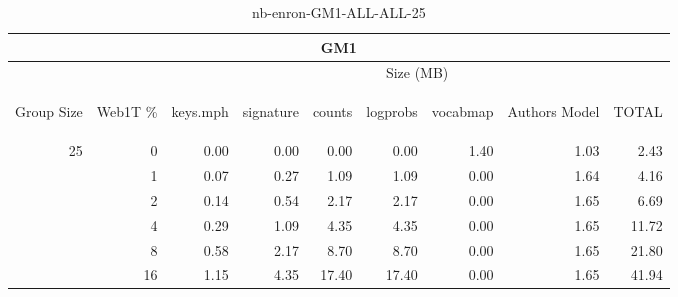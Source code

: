 \begin{center}
\begin{table}[htbp]
\begin{tabular}{ | r | r | r | r | r | r | r | r | r |}
\hline
\multicolumn{9}{|c|}{GM1}\\
\hline
 & & \multicolumn{7}{|c|}{Size (MB)}\\ \cline{3-9}
\begin{sideways}Group Size\end{sideways} & \begin{sideways}Web1T \% \end{sideways} & \begin{sideways}keys.mph\end{sideways} & \begin{sideways}signature\end{sideways} & \begin{sideways}counts\end{sideways} & \begin{sideways}logprobs\end{sideways} & \begin{sideways}vocabmap\end{sideways} & \begin{sideways}Authors Model \end{sideways} & \begin{sideways}TOTAL\end{sideways}\\
\hline
\multirow{5}{*}{25}
 & 0 & 0.00 & 0.00 & 0.00 & 0.00 & 1.40 & 1.03 & 2.43\\ \cline{2-9}
 & 1 & 0.07 & 0.27 & 1.09 & 1.09 & 0.00 & 1.64 & 4.16\\ \cline{2-9}
 & 2 & 0.14 & 0.54 & 2.17 & 2.17 & 0.00 & 1.65 & 6.69\\ \cline{2-9}
 & 4 & 0.29 & 1.09 & 4.35 & 4.35 & 0.00 & 1.65 & 11.72\\ \cline{2-9}
 & 8 & 0.58 & 2.17 & 8.70 & 8.70 & 0.00 & 1.65 & 21.80\\ \cline{2-9}
 & 16 & 1.15 & 4.35 & 17.40 & 17.40 & 0.00 & 1.65 & 41.94\\ \cline{2-9}
\hline
\end{tabular}
\caption{nb-enron-GM1-ALL-ALL-25}
\label{table:nb-enron-GM1-ALL-ALL-25}
\end{table}
\end{center}

